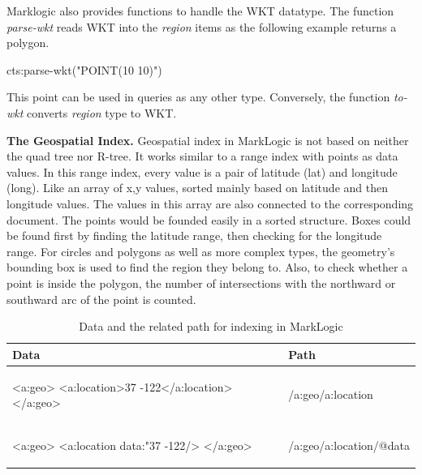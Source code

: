 \documentclass[a4paper,12pt]{article}
\begin{document}
Marklogic also provides functions to handle the WKT datatype. The function \textit{parse-wkt} reads WKT into the \textit{region} items as the following example returns a polygon.
\vspace{10px}
\begin{fakeJSON}
cts:parse-wkt("POINT(10 10)")
\end{fakeJSON}
\vspace{10px}
This point can be used in queries as any other type. Conversely, the function \textit{to-wkt} converts \textit{region} type to WKT.


\textbf{The Geospatial Index.}
Geospatial index in MarkLogic is not based on neither the quad tree nor R-tree. It works similar to a range index with points as data values. In this range index, every value is a pair of latitude (lat) and longitude (long). Like an array of x,y values, sorted mainly based on latitude and then longitude values. The values in this array are also connected to the corresponding document.
The points would be founded easily in a sorted structure. 
Boxes could be found first by finding the latitude range, then checking for the longitude range. 
For circles and polygons as well as more complex types, the geometry's bounding box is used to find the region they belong to. 
Also, to check whether a point is inside the polygon, the number of intersections with the northward or southward arc of the point is counted.
\vspace{10px}
\begin{table}
\centering
\begin{tabular}{|l |l |}\hline
\textbf{Data} & \textbf{Path}\\\hline
\begin{fakeJSON}
<a:geo>
  <a:location>37 -122</a:location>
</a:geo>
\end{fakeJSON} &
\begin{fakeJSON}
/a:geo/a:location
\end{fakeJSON}\\\hline
\begin{fakeJSON}
<a:geo>
  <a:location data:"37 -122/>
</a:geo>
\end{fakeJSON} &
\begin{fakeJSON}
/a:geo/a:location/@data
\end{fakeJSON}
\\\hline
\end{tabular}
\caption{Data and the related path for indexing in MarkLogic}
\label{t.pathindexmarklogic}
\end{table}
\end{document}
